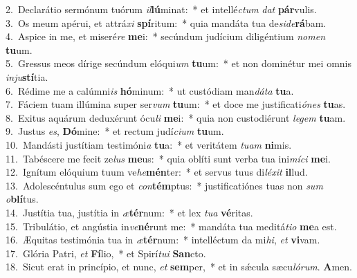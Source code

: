 {2.~}Declarátio sermónum tuórum \textit{il}\textbf{lú}minat:~* et intellé\textit{ctum} \textit{dat} \textbf{pár}vulis.\\
{3.~}Os meum apérui, et attrá\textit{xi} \textbf{spí}ritum:~* quia mandáta tua de\textit{si}\textit{de}\textbf{rá}bam.\\
{4.~}Aspice in me, et miseré\textit{re} \textbf{me}i:~* secúndum judícium diligéntium \textit{no}\textit{men} \textbf{tu}um.\\
{5.~}Gressus meos dírige secúndum elóqui\textit{um} \textbf{tu}um:~* et non dominétur mei omnis \textit{in}\textit{ju}\textbf{stí}tia.\\
{6.~}Rédime me a calúmni\textit{is} \textbf{hó}minum:~* ut custódiam man\textit{dá}\textit{ta} \textbf{tu}a.\\
{7.~}Fáciem tuam illúmina super ser\textit{vum} \textbf{tu}um:~* et doce me justificati\textit{ó}\textit{nes} \textbf{tu}as.\\
{8.~}Exitus aquárum deduxérunt ócu\textit{li} \textbf{me}i:~* quia non custodiérunt \textit{le}\textit{gem} \textbf{tu}am.\\
{9.~}Justus \textit{es}, \textbf{Dó}mine:~* et rectum judí\textit{ci}\textit{um} \textbf{tu}um.\\
{10.~}Mandásti justítiam testimóni\textit{a} \textbf{tu}a:~* et veritátem \textit{tu}\textit{am} \textbf{ni}mis.\\
{11.~}Tabéscere me fecit ze\textit{lus} \textbf{me}us:~* quia oblíti sunt verba tua ini\textit{mí}\textit{ci} \textbf{me}i.\\
{12.~}Ignítum elóquium tuum ve\textit{he}\textbf{mén}ter:~* et servus tuus di\textit{lé}\textit{xit} \textbf{il}lud.\\
{13.~}Adolescéntulus sum ego et \textit{con}\textbf{tém}ptus:~* justificatiónes tuas non \textit{sum} \textit{o}\textbf{blí}tus.\\
{14.~}Justítia tua, justítia in \textit{æ}\textbf{tér}num:~* et lex \textit{tu}\textit{a} \textbf{vé}ritas.\\
{15.~}Tribulátio, et angústia in\textit{ve}\textbf{né}runt me:~* mandáta tua meditá\textit{ti}\textit{o} \textbf{me}a est.\\
{16.~}Æquitas testimónia tua in \textit{æ}\textbf{tér}num:~* intelléctum da mi\textit{hi}, \textit{et} \textbf{vi}vam.\\
{17.~}Glória Patri, \textit{et} \textbf{Fí}lio,~* et Spirí\textit{tu}\textit{i} \textbf{San}cto.\\
{18.~}Sicut erat in princípio, et nunc, \textit{et} \textbf{sem}per,~* et in sǽcula sæcu\textit{ló}\textit{rum}. \textbf{A}men.\\
